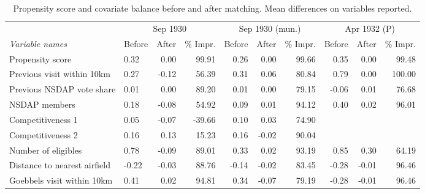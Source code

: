 \begin{table}[t!]
\centering
\caption{Propensity score and covariate balance before and after matching. Mean differences on variables reported.\label{tab:balance1}} 
\begingroup\scriptsize
\begin{tabular}{llrrrrrrrr}
  \toprule
   & \multicolumn{3}{c}{Sep 1930} &  \multicolumn{3}{c}{Sep 1930 (mun.)} & \multicolumn{3}{c}{Apr 1932 (P)}\\\cmidrule(r){2-4} \cmidrule(r){5-7} \cmidrule(r){8-10}\textit{Variable names} & Before & After & \% Impr. & Before & After & \% Impr. & Before & After & \% Impr.\\ \midrule
Propensity score &  0.32 &  0.00 &  99.91 &  0.26 &  0.00 &  99.66 &  0.35 &  0.00 &  99.48 \\ 
  Previous visit within 10km &  0.27 & -0.12 &  56.39 &  0.31 &  0.06 &  80.84 &  0.79 &  0.00 & 100.00 \\ 
  Previous NSDAP vote share &  0.01 &  0.00 &  89.20 &  0.01 &  0.00 &  79.15 & -0.06 &  0.01 &  76.68 \\ 
  NSDAP members &  0.18 & -0.08 &  54.92 &  0.09 &  0.01 &  94.12 &  0.40 &  0.02 &  96.01 \\ 
  Competitiveness 1 &  0.05 & -0.07 & -39.66 &  0.10 &  0.03 &  74.90 &  &  &  \\ 
  Competitiveness 2 &  0.16 &  0.13 &  15.23 &  0.16 & -0.02 &  90.04 &  &  &  \\ 
  Number of eligibles &  0.78 & -0.09 &  89.01 &  0.33 &  0.02 &  93.19 &  0.85 &  0.30 &  64.19 \\ 
  Distance to nearest airfield & -0.22 & -0.03 &  88.76 & -0.14 & -0.02 &  83.45 & -0.28 & -0.01 &  96.46 \\ 
  Goebbels visit within 10km &  0.41 &  0.02 &  94.81 &  0.34 & -0.07 &  79.19 & -0.28 & -0.01 &  96.46 \\ 
   \bottomrule
\end{tabular}
\endgroup
\end{table}
